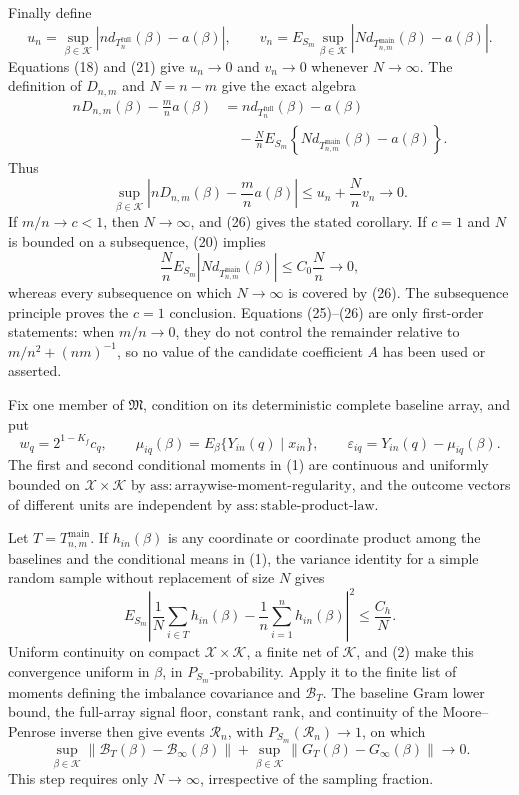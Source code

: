 Finally define
\[
u_n=\sup_{\beta\in\mathcal K}
\left|n d_{T_n^{\mathrm{full}}}(\beta)-a(\beta)\right|,
\qquad
v_n=E_{S_m}\sup_{\beta\in\mathcal K}
\left|N d_{T_{n,m}^{\mathrm{main}}}(\beta)-a(\beta)\right|.
\tag{24}
\]
Equations (18) and (21) give \(u_n\to0\) and \(v_n\to0\) whenever \(N\to\infty\).  The definition of \(D_{n,m}\) and \(N=n-m\) give the exact algebra
\[
\begin{aligned}
nD_{n,m}(\beta)-\frac mn a(\beta)
&=n d_{T_n^{\mathrm{full}}}(\beta)-a(\beta)\\
&\quad-\frac Nn E_{S_m}
\left\{N d_{T_{n,m}^{\mathrm{main}}}(\beta)-a(\beta)\right\}.
\end{aligned}
\tag{25}
\]
Thus
\[
\sup_{\beta\in\mathcal K}
\left|nD_{n,m}(\beta)-\frac mn a(\beta)\right|
\leq u_n+\frac Nn v_n\longrightarrow0.
\tag{26}
\]
If \(m/n\to c<1\), then \(N\to\infty\), and (26) gives the stated corollary.  If \(c=1\) and \(N\) is bounded on a subsequence, (20) implies
\[
\frac Nn E_{S_m}\left|N d_{T_{n,m}^{\mathrm{main}}}(\beta)\right|
\leq C_0\frac Nn\longrightarrow0,
\tag{27}
\]
whereas every subsequence on which \(N\to\infty\) is covered by (26).  The subsequence principle proves the \(c=1\) conclusion.  Equations (25)--(26) are only first-order statements: when \(m/n\to0\), they do not control the remainder relative to \(m/n^2+(nm)^{-1}\), so no value of the candidate coefficient \(A\) has been used or asserted.

Fix one member of \(\mathfrak M\), condition on its deterministic complete baseline array, and put
\[
w_q=2^{1-K_f}c_q,
\qquad
\mu_{iq}(\beta)=E_\beta\{Y_{in}(q)\mid x_{in}\},
\qquad
\varepsilon_{iq}=Y_{in}(q)-\mu_{iq}(\beta).
\tag{1}
\]
The first and second conditional moments in (1) are continuous and uniformly bounded on \(\mathcal X\times\mathcal K\) by \(\mathrm{ass{:}arraywise\text{-}moment\text{-}regularity}\), and the outcome vectors of different units are independent by \(\mathrm{ass{:}stable\text{-}product\text{-}law}\).

Let \(T=T_{n,m}^{\mathrm{main}}\).  If \(h_{in}(\beta)\) is any coordinate or coordinate product among the baselines and the conditional means in (1), the variance identity for a simple random sample without replacement of size \(N\) gives
\[
E_{S_m}\left|
\frac1N\sum_{i\in T}h_{in}(\beta)
-\frac1n\sum_{i=1}^nh_{in}(\beta)
\right|^2\leq\frac{C_h}{N}.
\tag{2}
\]
Uniform continuity on compact \(\mathcal X\times\mathcal K\), a finite net of \(\mathcal K\), and (2) make this convergence uniform in \(\beta\), in \(P_{S_m}\)-probability.  Apply it to the finite list of moments defining the imbalance covariance and \(\mathcal B_T\).  The baseline Gram lower bound, the full-array signal floor, constant rank, and continuity of the Moore--Penrose inverse then give events \(\mathcal R_n\), with \(P_{S_m}(\mathcal R_n)\to1\), on which
\[
\sup_{\beta\in\mathcal K}
\left\|\mathcal B_T(\beta)-\mathcal B_\infty(\beta)\right\|
+
\sup_{\beta\in\mathcal K}
\left\|G_T(\beta)-G_\infty(\beta)\right\|
\longrightarrow0.
\tag{3}
\]
This step requires only \(N\to\infty\), irrespective of the sampling fraction.

